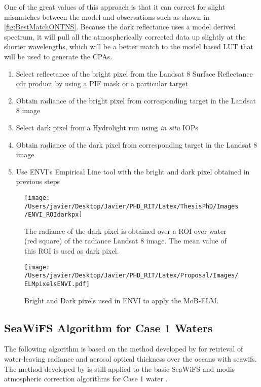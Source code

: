 One of the great values of this approach is that it can correct for slight mismatches between the model and observations such as shown in \autoref{fig:BestMatchONTNS}. Because the dark reflectance uses a model derived spectrum, it will pull all the atmospherically corrected data up slightly at the shorter wavelengths, which will be a better match to the model based LUT that will be used to generate the CPAs.

\begin{enumerate}[itemsep=2pt,parsep=2pt]
  \item Select reflectance of the bright pixel from the Landsat 8 Surface Reflectance \gls{cdr} product by using a PIF mask or a particular target
  \item Obtain radiance of the bright pixel from corresponding target in the Landsat 8 image
  \item Select dark pixel from a Hydrolight run using {\it in situ} IOPs
  \item Obtain radiance of the dark pixel from corresponding target in the Landsat 8 image
  \item Use ENVI's Empirical Line tool with the bright and dark pixel obtained in previous steps
\end{enumerate}

\begin{figure}[htb]
    \centering
    \texttt{[image: /Users/javier/Desktop/Javier/PHD\_RIT/Latex/ThesisPhD/Images/ENVI\_ROIdarkpx]}
  \caption{The radiance of the dark pixel is obtained over a ROI over water (red square) of the radiance Landsat 8 image. The mean value of this ROI is used as dark pixel.\label{fig:ENVIROI_darkpx} } 
\end{figure}
\begin{figure}[htb]
  \centering
  \texttt{[image: /Users/javier/Desktop/Javier/PHD\_RIT/Latex/Proposal/Images/ELMpixelsENVI.pdf]}
  \caption{Bright and Dark pixels used in ENVI to apply the MoB-ELM. \label{fig:ELMpxsENVI} } 
\end{figure}

\subsection{SeaWiFS Algorithm for Case 1 Waters}
\label{subsec:gordon}
The following algorithm is based on the method developed by \citet{Gordon:1994} for retrieval of water-leaving radiance and aerosol optical thickness over the oceans with \gls{seawifs}. The method developed by \citet{Gordon:1994} is still applied to the basic SeaWiFS and \gls{modis} atmospheric correction algorithms for Case 1 water \citep{IOCCG:2010}.

